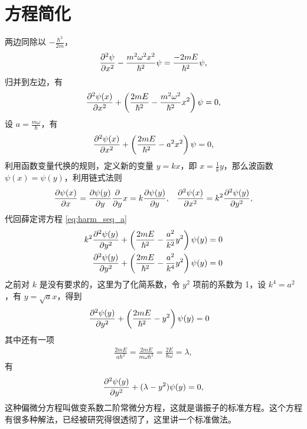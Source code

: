 \section{方程简化}

两边同除以 $-\frac{\hbar^2}{2m}$，
\begin{align}
    \pdv[2]{\psi}{x} - \frac{m^2\omega^2 x^2}{\hbar^2} \psi = \frac{-2mE}{\hbar^2}\psi,
\end{align}
归并到左边，有
\begin{align}
    \pdv[2]{\psi(x)}{x} + \left(
        \frac{2mE}{\hbar^2} - \frac{m^2\omega^2}{\hbar^2} x^2
    \right) \psi = 0,
\end{align}
设 $a = \frac{m\omega}{\hbar}$，有
\begin{align}
    \pdv[2]{\psi(x)}{x} + \left(
        \frac{2mE}{\hbar^2} - a^2 x^2
    \right) \psi = 0,
    \label{eq:harm_seq_a}
\end{align}
利用函数变量代换的规则，定义新的变量 $y = kx$，即 $x = \frac 1k y$，那么波函数 $\psi(x) = \psi(y)$，利用链式法则
\begin{align}
    &\pdv{\psi(x)}{x} = \pdv{\psi(y)}{y} \pdv yx = k \pdv{\psi(y)} {y},
    &\pdv[2]{\psi(x)}{x} = k^2 \pdv[2]{\psi(y)}{y},
\end{align}
代回薛定谔方程 \eqref{eq:harm_seq_a}
\begin{align}
    k^2 \pdv[2]{\psi(y)}{y} + \left(
        \frac{2mE}{\hbar^2} - \frac{a^2}{k^2} y^2
    \right) \psi(y) &= 0 \\
    \pdv[2]{\psi(y)}{y} + \left(
        \frac{2mE}{\hbar^2} - \frac{a^2}{k^4} y^2
    \right) \psi(y) &= 0
\end{align}
之前对 $k$ 是没有要求的，这里为了化简系数，令 $y^2$ 项前的系数为 1，设 $k^4 = a^2$，有 $y = \sqrt a x$，得到
\begin{align}
    \pdv[2]{\psi(y)}{y} + \left(
        \frac{2mE}{\hbar^2} - y^2
    \right) \psi(y) &= 0
\end{align}
其中还有一项
\begin{eqnarray}
    \frac{2mE}{a\hbar^2} = \frac{2mE}{m\omega\hbar^2} = \frac{2E}{\hbar\omega} = \lambda,
\end{eqnarray}
有
\begin{align}
    \pdv[2]{\psi(y)}{y} + (\lambda - y^2) \psi(y) = 0,
    \label{eq:harm_seq_lambda_y}
\end{align}
这种偏微分方程叫做变系数二阶常微分方程，这就是谐振子的标准方程。这个方程有很多种解法，已经被研究得很透彻了，这里讲一个标准做法。

